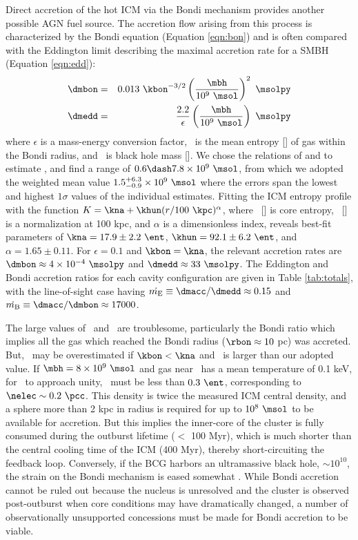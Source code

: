 \documentclass[iop]{emulateapj}
\begin{document}
Direct accretion of the hot ICM via the Bondi mechanism provides
another possible AGN fuel source. The accretion flow arising from this
process is characterized by the Bondi equation (Equation
\ref{eqn:bon}) and is often compared with the Eddington limit
describing the maximal accretion rate for a SMBH (Equation
\ref{eqn:edd}):
\begin{eqnarray}
  \dmbon &=& 0.013 ~\kbon^{-3/2} \left(\frac{\mbh}{10^9
    ~\msol}\right)^{2} ~\msolpy \label{eqn:bon}\\
  \dmedd &=& \frac{2.2}{\epsilon} \left(\frac{\mbh}{10^9~\msol}\right)
  ~\msolpy  \label{eqn:edd}
\end{eqnarray}
where $\epsilon$ is a mass-energy conversion factor, \kbon\ is the
mean entropy [\ent] of gas within the Bondi radius, and \mbh\ is black
hole mass [\msol]. We chose the relations of
\citet{2002ApJ...574..740T} and \citet{2007MNRAS.379..711G} to
estimate \mbh, and find a range of $0.6 \dash 7.8 \times 10^9 ~\msol$,
from which we adopted the weighted mean value $1.5^{+6.3}_{-0.9}
\times 10^9 ~\msol$ where the errors span the lowest and highest
$1\sigma$ values of the individual estimates. Fitting the ICM entropy
profile with the function $K = \kna +\khun (r/100 ~\kpc)^{\alpha}$,
where \kna\ [\ent] is core entropy, \khun\ [\ent] is a normalization
at 100 kpc, and $\alpha$ is a dimensionless index, reveals best-fit
parameters of $\kna = 17.9 \pm 2.2 ~\ent$, $\khun = 92.1 \pm 6.2
~\ent$, and $\alpha = 1.65 \pm 0.11$. For $\epsilon = 0.1$ and $\kbon
= \kna$, the relevant accretion rates are $\dmbon \approx 4 \times
10^{-4} ~\msolpy$ and $\dmedd \approx 33 ~\msolpy$. The Eddington and
Bondi accretion ratios for each cavity configuration are given in Table
\ref{tab:totals}, with the line-of-sight case having $\dme \equiv
\dmacc/\dmedd \approx 0.15$ and $\dmb \equiv \dmacc/\dmbon \approx
17000$.

The large values of \dme\ and \dmb\ are troublesome, particularly the
Bondi ratio which implies all the gas which reached the Bondi radius
($\rbon \approx 10$ pc) was accreted. But, \dmb\ may be overestimated
if $\kbon < \kna$ and \mbh\ is larger than our adopted value. If $\mbh
= 8 \times 10^9 ~\msol$ and gas near \rbon\ has a mean temperature of
0.1 keV, for \dmb\ to approach unity, \kbon\ must be less than $0.3
~\ent$, corresponding to $\nelec \sim 0.2 ~\pcc$. This density is
twice the measured ICM central density, and a sphere more than 2 kpc
in radius is required for up to $10^8 ~\msol$ to be available for
accretion. But this implies the inner-core of the cluster is fully
consumed during the outburst lifetime ($<$ 100 Myr), which is much
shorter than the central cooling time of the ICM (400 Myr), thereby
short-circuiting the feedback loop. Conversely, if the BCG harbors an
ultramassive black hole, $\sim 10^{10}$, the strain on the Bondi
mechanism is eased somewhat \citep[\eg][]{msspin}. While Bondi
accretion cannot be ruled out because the nucleus is unresolved and
the cluster is observed post-outburst when core conditions may have
dramatically changed, a number of observationally unsupported
concessions must be made for Bondi accretion to be viable.
\end{document}
